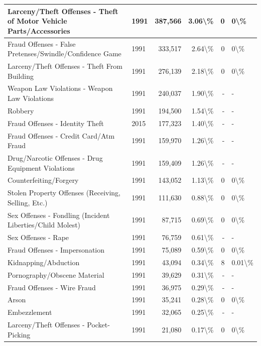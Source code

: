 \documentclass[
]{krantz}
\begin{document}
\begin{longtable}[t]{l|l|r|r|r|l}
\hline
Larceny/Theft Offenses - Theft of Motor Vehicle Parts/Accessories & 1991 & 387,566 & 3.06\textbackslash{}\% & 0 & 0\textbackslash{}\%\\
\hline
Fraud Offenses - False Pretenses/Swindle/Confidence Game & 1991 & 333,517 & 2.64\textbackslash{}\% & 0 & 0\textbackslash{}\%\\
\hline
Larceny/Theft Offenses - Theft From Building & 1991 & 276,139 & 2.18\textbackslash{}\% & 0 & 0\textbackslash{}\%\\
\hline
Weapon Law Violations - Weapon Law Violations & 1991 & 240,037 & 1.90\textbackslash{}\% & - & -\\
\hline
Robbery & 1991 & 194,500 & 1.54\textbackslash{}\% & - & -\\
\hline
Fraud Offenses - Identity Theft & 2015 & 177,323 & 1.40\textbackslash{}\% & - & -\\
\hline
Fraud Offenses - Credit Card/Atm Fraud & 1991 & 159,970 & 1.26\textbackslash{}\% & - & -\\
\hline
Drug/Narcotic Offenses - Drug Equipment Violations & 1991 & 159,409 & 1.26\textbackslash{}\% & - & -\\
\hline
Counterfeiting/Forgery & 1991 & 143,052 & 1.13\textbackslash{}\% & 0 & 0\textbackslash{}\%\\
\hline
Stolen Property Offenses (Receiving, Selling, Etc.) & 1991 & 111,630 & 0.88\textbackslash{}\% & 0 & 0\textbackslash{}\%\\
\hline
Sex Offenses - Fondling (Incident Liberties/Child Molest) & 1991 & 87,715 & 0.69\textbackslash{}\% & 0 & 0\textbackslash{}\%\\
\hline
Sex Offenses - Rape & 1991 & 76,759 & 0.61\textbackslash{}\% & - & -\\
\hline
Fraud Offenses - Impersonation & 1991 & 75,089 & 0.59\textbackslash{}\% & 0 & 0\textbackslash{}\%\\
\hline
Kidnapping/Abduction & 1991 & 43,094 & 0.34\textbackslash{}\% & 8 & 0.01\textbackslash{}\%\\
\hline
Pornography/Obscene Material & 1991 & 39,629 & 0.31\textbackslash{}\% & - & -\\
\hline
Fraud Offenses - Wire Fraud & 1991 & 36,975 & 0.29\textbackslash{}\% & - & -\\
\hline
Arson & 1991 & 35,241 & 0.28\textbackslash{}\% & 0 & 0\textbackslash{}\%\\
\hline
Embezzlement & 1991 & 32,065 & 0.25\textbackslash{}\% & - & -\\
\hline
Larceny/Theft Offenses - Pocket-Picking & 1991 & 21,080 & 0.17\textbackslash{}\% & 0 & 0\textbackslash{}\%\\

\end{longtable}
\end{document}
